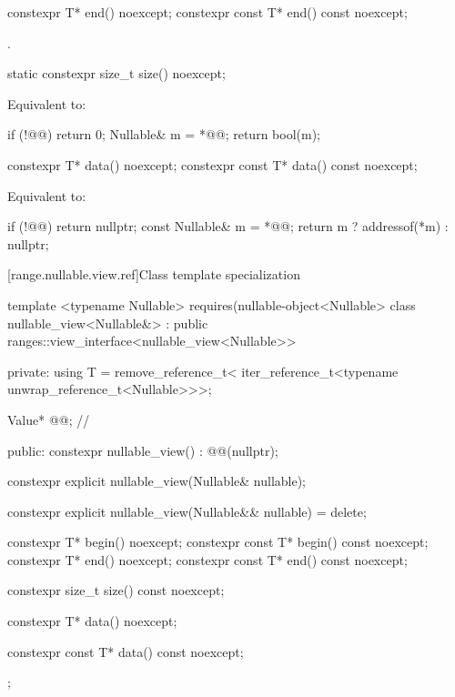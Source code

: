 \begin{itemdecl}
constexpr T* end() noexcept;
constexpr const T* end() const noexcept;
\end{itemdecl}

\begin{itemdescr}
\pnum{}
\returns {}.
\end{itemdescr}

\begin{itemdecl}
static constexpr size_t size() noexcept;
\end{itemdecl}

\begin{itemdescr}
\pnum{}
\effects{}
Equivalent to:

\begin{codeblock}
if (!@@)
  return 0;
Nullable& m = *@@;
return bool(m);
\end{codeblock}
\end{itemdescr}

\begin{itemdecl}
constexpr T* data() noexcept;
constexpr const T* data() const noexcept;
\end{itemdecl}

\begin{itemdescr}
\pnum{}
\effects{}
Equivalent to:
\begin{codeblock}
if (!@@)
  return nullptr;
const Nullable& m = *@@;
return m ? addressof(*m) : nullptr;
\end{codeblock}
\end{itemdescr}



[range.nullable.view.ref]{Class template specialization }

\begin{codeblock}
template <typename Nullable>
  requires(nullable-object<Nullable>
class nullable_view<Nullable&>
    : public ranges::view_interface<nullable_view<Nullable>> {
  private:
    using T = remove_reference_t<
        iter_reference_t<typename unwrap_reference_t<Nullable>>>;

    Value* @@; // \expos{}

  public:
    constexpr nullable_view() : @@(nullptr){};

    constexpr explicit nullable_view(Nullable& nullable);

    constexpr explicit nullable_view(Nullable&& nullable) = delete;

    constexpr T*       begin() noexcept;
    constexpr const T* begin() const noexcept;
    constexpr T*       end() noexcept;
    constexpr const T* end() const noexcept;

    constexpr size_t size() const noexcept;

    constexpr T* data() noexcept;

    constexpr const T* data() const noexcept;
};

\end{codeblock}



